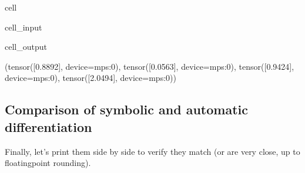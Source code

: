 \documentclass[letterpaper,10pt,english]{jupyterBook}
\begin{document}
\begin{sphinxuseclass}{cell}
\begin{sphinxVerbatimInput}
\begin{sphinxuseclass}{cell_input}
\end{sphinxuseclass}\end{sphinxVerbatimInput}
\begin{sphinxVerbatimOutput}

\begin{sphinxuseclass}{cell_output}
\begin{sphinxVerbatim}[commandchars=\\\{\}]
(tensor([\PYGZhy{}0.8892], device=\PYGZsq{}mps:0\PYGZsq{}),
 tensor([\PYGZhy{}0.0563], device=\PYGZsq{}mps:0\PYGZsq{}),
 tensor([0.9424], device=\PYGZsq{}mps:0\PYGZsq{}),
 tensor([2.0494], device=\PYGZsq{}mps:0\PYGZsq{}))
\end{sphinxVerbatim}

\end{sphinxuseclass}\end{sphinxVerbatimOutput}

\end{sphinxuseclass}

\subsection{Comparison of symbolic and automatic differentiation}
\label{\detokenize{04:comparison-of-symbolic-and-automatic-differentiation}}
\sphinxAtStartPar
Finally, let’s print them side by side to verify they match (or are very close, up to floating\sphinxhyphen{}point rounding).
\end{document}
